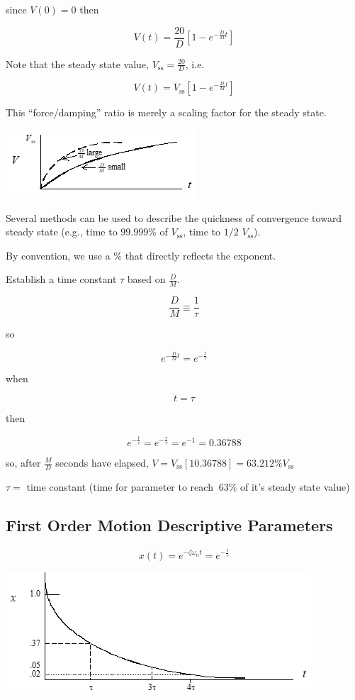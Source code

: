 \documentclass[
]{book}
\begin{document}
since \(V(0) = 0\) then

\[ V(t) = \frac{20}{D} \left[ 1  -e^{-\frac{D}{M}t} \right] \]

Note that the steady state value, \(V_{\mathrm{ss}} = \frac{20}{D}\), i.e.

\[ V(t) = V_{\mathrm{ss}} \left[1  -e^{-\frac{D}{M}t} \right] \]

This ``force/damping'' ratio is merely a scaling factor for the steady state.

\includegraphics{media/08/image9.png}

Several methods can be used to describe the quickness of convergence toward steady state (e.g., time to \(99.999\%\) of \(V_{\mathrm{ss}}\), time to \(1/2\) \(V_{\mathrm{ss}}\)).

By convention, we use a \(\%\) that directly reflects the exponent.

Establish a time constant \(\tau\) based on \(\frac{D}{M}\).

\[\frac{D}{M} \equiv \frac{1}{\tau} \]

so

\[e^{-\frac{D}{M}t} = e^{-\frac{t}{\tau}}\]

when

\[t = \tau\]

then

\[e^{-\frac{t}{\tau}} = e^{-\frac{\tau}{\tau}} = e^{-1} = 0.36788\]

so, after \(\frac{M}{D}\) seconds have elapsed, \(V = V_{\mathrm{ss}} \left[1 0.36788 \right] = 63.212\% V_{\mathrm{ss}}\)

\(\tau =\) time constant (time for parameter to reach \(~63\%\) of it's steady state value)

\hypertarget{first-order-motion-descriptive-parameters}{%
\subsection{First Order Motion Descriptive Parameters}\label{first-order-motion-descriptive-parameters}}

\[ x(t) = e^{-\zeta \omega_n t} = e^{-\frac{t}{\tau}} \]

\includegraphics{media/08/image12.png}
\end{document}
